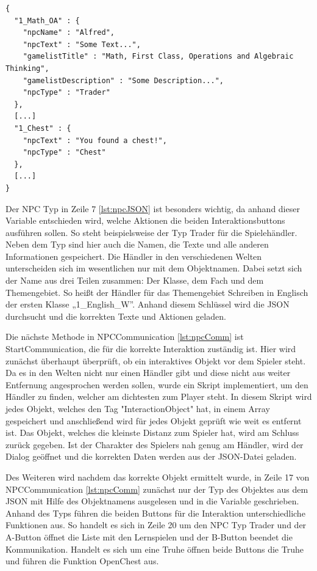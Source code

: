 	\begin{scriptsize}
		\lstset{
			float,
			caption=NPC JSON, 
			language=[Sharp]C, 
			frame=single,  
			showstringspaces=false, 
			showspaces=false, 
			numbers=left, 
			captionpos=b, 
			belowcaptionskip=4pt,
			basicstyle=\ttfamily
		} 
		\begin{lstlisting}[label=lst:npcJSON]
{
  "1_Math_OA" : { 
    "npcName" : "Alfred",
    "npcText" : "Some Text...",
    "gamelistTitle" : "Math, First Class, Operations and Algebraic Thinking",
    "gamelistDescription" : "Some Description...",
    "npcType" : "Trader"
  },
  [...]
  "1_Chest" : {
    "npcText" : "You found a chest!",
    "npcType" : "Chest"
  },
  [...]
}
		\end{lstlisting}
	\end{scriptsize}
	
			Der NPC Typ in Zeile 7 \ref{lst:npcJSON} ist besonders wichtig, da anhand dieser Variable entschieden wird, welche Aktionen die beiden Interaktionsbuttons ausführen sollen. So steht beispielsweise der Typ Trader für die Spielehändler. Neben dem Typ sind hier auch die Namen, die Texte und alle anderen Informationen gespeichert. Die Händler in den verschiedenen Welten unterscheiden sich im wesentlichen nur mit dem Objektnamen. Dabei setzt sich der Name aus drei Teilen zusammen: Der Klasse, dem Fach und dem Themengebiet. So heißt der Händler für das Themengebiet Schreiben in Englisch der ersten Klasse „1\_English\_W”. Anhand diesem Schlüssel wird die JSON durchsucht und die korrekten Texte und Aktionen geladen.
	
			Die nächste Methode in NPCCommunication \ref{lst:npcComm} ist StartCommunication, die für die korrekte Interaktion zuständig ist. Hier wird zunächst überhaupt überprüft, ob ein interaktives Objekt vor dem Spieler steht. Da es in den Welten nicht nur einen Händler gibt und diese nicht aus weiter Entfernung angesprochen werden sollen, wurde ein Skript implementiert, um den Händler zu finden, welcher am dichtesten zum Player steht. In diesem Skript wird jedes Objekt, welches den Tag "InteractionObject" hat, in einem Array gespeichert und anschließend wird für jedes Objekt geprüft wie weit es entfernt ist. Das Objekt, welches die kleinste Distanz zum Spieler hat, wird am Schluss zurück gegeben. Ist der Charakter des Spielers nah genug am Händler, wird der Dialog geöffnet und die korrekten Daten werden aus der \ac{JSON}-Datei geladen.
	
			Des Weiteren wird nachdem das korrekte Objekt ermittelt wurde, in Zeile 17 von NPCCommunication \ref{lst:npcComm} zunächst nur der Typ des Objektes aus dem \ac{JSON} mit Hilfe des Objektnamens ausgelesen und in die Variable geschrieben. Anhand des Typs führen die beiden Buttons für die Interaktion unterschiedliche Funktionen aus. So handelt es sich in Zeile 20 um den NPC Typ Trader und der A-Button öffnet die Liste mit den Lernspielen und der B-Button beendet die Kommunikation. Handelt es sich um eine Truhe öffnen beide Buttons die Truhe und führen die Funktion OpenChest aus.

